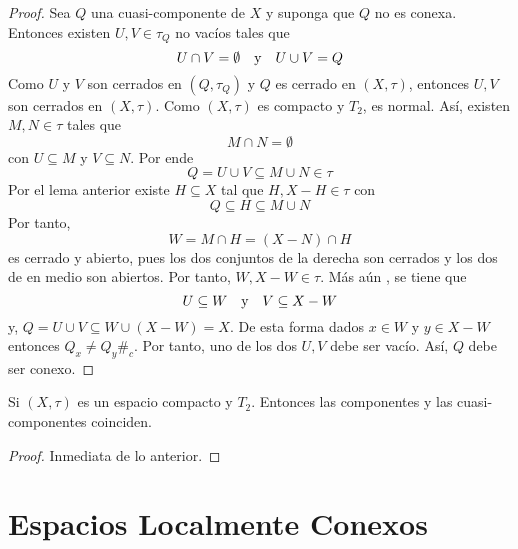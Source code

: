 \documentclass[12pt]{report}
\theoremstyle{largebreak}
\newcommand\contradiction{\ensuremath{\#_c}}
\begin{document}
    \begin{proof}
        Sea $Q$ una cuasi-componente de $X$ y suponga que $Q$ no es conexa. Entonces existen $U,V\in\tau_Q$ no vacíos tales que
        \begin{equation*}
            U\cap V=\emptyset\quad\textup{y}\quad U\cup V=Q
        \end{equation*}
        Como $U$ y $V$ son cerrados en $(Q,\tau_Q)$ y $Q$ es cerrado en $(X,\tau)$, entonces $U,V$ son cerrados en $(X,\tau)$. Como $(X,\tau)$ es compacto y $T_2$, es normal. Así, existen $M,N\in\tau$ tales que
        \begin{equation*}
            M\cap N=\emptyset
        \end{equation*}
        con $U\subseteq M$ y $V\subseteq N$. Por ende
        \begin{equation*}
            Q=U\cup V\subseteq M\cup N\in\tau
        \end{equation*}
        Por el lema anterior existe $H\subseteq X$ tal que $H,X-H\in\tau$ con
        \begin{equation*}
            Q\subseteq H\subseteq M\cup N
        \end{equation*}
        Por tanto,
        \begin{equation*}
            W=M\cap H=(X-N)\cap H
        \end{equation*}
        es cerrado y abierto, pues los dos conjuntos de la derecha son cerrados y los dos de en medio son abiertos. Por tanto, $W,X-W\in\tau$. Más aún , se tiene que
        \begin{equation*}
            U\subseteq W\quad\textup{y}\quad V\subseteq X-W
        \end{equation*}
        y, $Q=U\cup V\subseteq W\cup (X-W)=X$. De esta forma dados $x\in W$ y $y\in X-W$ entonces $Q_x\neq Q_y$\contradiction. Por tanto, uno de los dos $U,V$ debe ser vacío. Así, $Q$ debe ser conexo.
    \end{proof}

    \begin{cor}
        Si $(X,\tau)$ es un espacio compacto y $T_2$. Entonces las componentes y las cuasi-componentes coinciden.
    \end{cor}

    \begin{proof}
        Inmediata de lo anterior.
    \end{proof}

    \section{Espacios Localmente Conexos}
\end{document}

